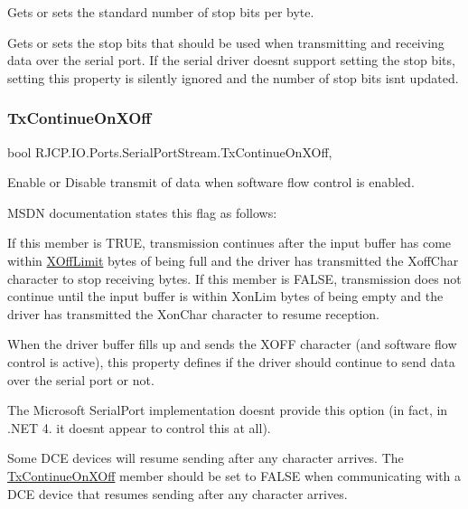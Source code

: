 Gets or sets the standard number of stop bits per byte. 

Gets or sets the stop bits that should be used when transmitting and receiving data over the serial port. If the serial driver doesn\textquotesingle{}t support setting the stop bits, setting this property is silently ignored and the number of stop bits isn\textquotesingle{}t updated. \mbox{\label{class_r_j_c_p_1_1_i_o_1_1_ports_1_1_serial_port_stream_a7811534e373c98d572fc3eae684abdf1}} 
\subsubsection{\texorpdfstring{TxContinueOnXOff}{TxContinueOnXOff}}
{\footnotesize\ttfamily bool R\+J\+C\+P.\+I\+O.\+Ports.\+Serial\+Port\+Stream.\+Tx\+Continue\+On\+X\+Off\hspace{0.3cm}{\ttfamily [get]}, {\ttfamily [set]}}



Enable or Disable transmit of data when software flow control is enabled. 

M\+S\+DN documentation states this flag as follows\+: 

If this member is T\+R\+UE, transmission continues after the input buffer has come within \mbox{\hyperlink{class_r_j_c_p_1_1_i_o_1_1_ports_1_1_serial_port_stream_a788b734b7f7ae0ea73d3d87ddefccb16}{X\+Off\+Limit}} bytes of being full and the driver has transmitted the Xoff\+Char character to stop receiving bytes. If this member is F\+A\+L\+SE, transmission does not continue until the input buffer is within Xon\+Lim bytes of being empty and the driver has transmitted the Xon\+Char character to resume reception.

When the driver buffer fills up and sends the X\+O\+FF character (and software flow control is active), this property defines if the driver should continue to send data over the serial port or not.

The Microsoft Serial\+Port implementation doesn\textquotesingle{}t provide this option (in fact, in .N\+ET 4. it doesn\textquotesingle{}t appear to control this at all).

Some D\+CE devices will resume sending after any character arrives. The \mbox{\hyperlink{class_r_j_c_p_1_1_i_o_1_1_ports_1_1_serial_port_stream_a7811534e373c98d572fc3eae684abdf1}{Tx\+Continue\+On\+X\+Off}} member should be set to F\+A\+L\+SE when communicating with a D\+CE device that resumes sending after any character arrives.\mbox{\label{class_r_j_c_p_1_1_i_o_1_1_ports_1_1_serial_port_stream_a1a440c81c5bb60740bec67f5b4e8061a}} 
